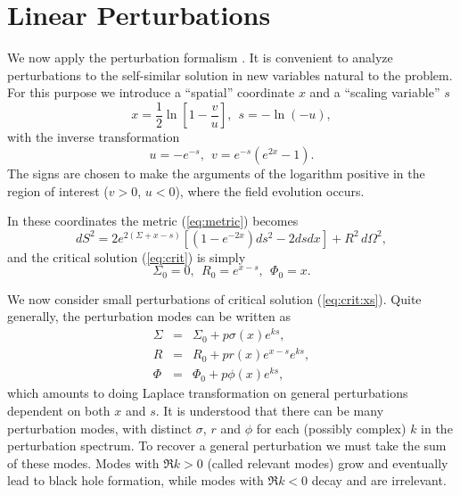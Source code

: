 \section{Linear Perturbations} \label{sec:pert}

We now apply the perturbation formalism
\cite{Koike&Hara&Adachi:95,Hara&Koike&Adachi:96,Maison:96}. It is
convenient to analyze perturbations to the self-similar solution in new
variables natural to the problem. For this purpose we introduce a
``spatial'' coordinate $x$ and a ``scaling variable'' $s$
\begin{equation} \label{eq:xs}
  x = \frac{1}{2} \ln \left[1 - \frac{v}{u}\right], \ \ 
  s = - \ln(-u),
\end{equation}
with the inverse transformation
\begin{equation} \label{eq:uv}
  u = - e^{-s}, \ \ 
  v = e^{-s} (e^{2x} - 1).
\end{equation}
The signs are chosen to make the arguments of the logarithm positive in
the region of interest ($v>0$, $u<0$), where the field evolution occurs.

In these coordinates the metric (\ref{eq:metric}) becomes
\begin{equation} \label{eq:metric:xs}
  dS^2 = 2 e^{2(\Sigma + x - s)}
    \left[(1 - e^{-2x}) ds^{2} - 2 ds dx\right] +
    R^2\, d\Omega^2,
\end{equation}
and the critical solution (\ref{eq:crit}) is simply
\begin{equation} \label{eq:crit:xs}
  \Sigma_0 = 0, \ \ 
  R_0 = e^{x-s}, \ \ 
  \Phi_0 = x.
\end{equation}

We now consider small perturbations of critical solution
(\ref{eq:crit:xs}). Quite generally, the perturbation modes
can be written as
\begin{eqnarray} \label{eq:pert}
  \Sigma &=& \Sigma_0 + p \sigma(x) e^{ks},\nonumber\\
  R &=& R_0 + p r(x) e^{x-s} e^{ks},\nonumber\\
  \Phi &=& \Phi_0 + p \phi(x) e^{ks},
\end{eqnarray}
which amounts to doing Laplace transformation on general perturbations
dependent on both $x$ and $s$. It is understood that there can be many
perturbation modes, with distinct $\sigma$, $r$ and $\phi$ for each
(possibly complex) $k$ in the perturbation spectrum. To recover a
general perturbation we must take the sum of these modes. Modes with
$\Re k>0$ (called relevant modes) grow and eventually lead to black
hole formation, while modes with $\Re k<0$ decay and are irrelevant.

